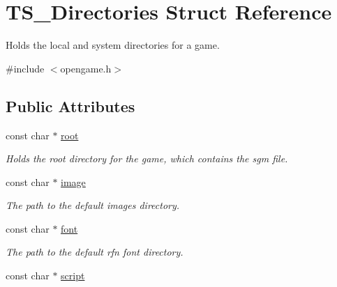 \hypertarget{structTS__Directories}{\section{T\-S\-\_\-\-Directories Struct Reference}
\label{structTS__Directories}
}


Holds the local and system directories for a game.  




{\ttfamily \#include $<$opengame.\-h$>$}

\subsection*{Public Attributes}
\begin{DoxyCompactItemize}
\item 
\hypertarget{structTS__Directories_a89c2f1bbdcee727a5f1f13414386139b}{const char $\ast$ \hyperlink{structTS__Directories_a89c2f1bbdcee727a5f1f13414386139b}{root}}\label{structTS__Directories_a89c2f1bbdcee727a5f1f13414386139b}

\begin{DoxyCompactList}\small\item\em Holds the root directory for the game, which contains the sgm file. \end{DoxyCompactList}\item 
\hypertarget{structTS__Directories_aba1be6c77d3caef7bde98be76710f828}{const char $\ast$ \hyperlink{structTS__Directories_aba1be6c77d3caef7bde98be76710f828}{image}}\label{structTS__Directories_aba1be6c77d3caef7bde98be76710f828}

\begin{DoxyCompactList}\small\item\em The path to the default images directory. \end{DoxyCompactList}\item 
\hypertarget{structTS__Directories_a8222f7d08ba45f9774a613b6a5cedec8}{const char $\ast$ \hyperlink{structTS__Directories_a8222f7d08ba45f9774a613b6a5cedec8}{font}}\label{structTS__Directories_a8222f7d08ba45f9774a613b6a5cedec8}

\begin{DoxyCompactList}\small\item\em The path to the default rfn font directory. \end{DoxyCompactList}\item 
\hypertarget{structTS__Directories_a11aaec62dee4299dcad8014ac3897409}{const char $\ast$ \hyperlink{structTS__Directories_a11aaec62dee4299dcad8014ac3897409}{script}}\label{structTS__Directories_a11aaec62dee4299dcad8014ac3897409}


\end{DoxyCompactItemize}
